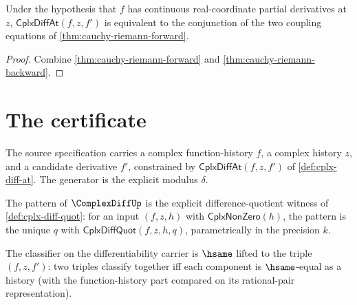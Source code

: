 \begin{lemma}
\label{lem:cauchy-riemann-iff}
Under the hypothesis that \(f\) has continuous real-coordinate partial derivatives at \(z\), \(\mathsf{CplxDiffAt}(f, z, f')\) is equivalent to the conjunction of the two coupling equations of \autoref{thm:cauchy-riemann-forward}.
\end{lemma}
\begin{proof}
Combine \autoref{thm:cauchy-riemann-forward} and \autoref{thm:cauchy-riemann-backward}.
\end{proof}

\section{The certificate}

\begin{definition}
\label{def:cplx-diff-source-specification}
The source specification carries a complex function-history \(f\), a complex history \(z\), and a candidate derivative \(f'\), constrained by \(\mathsf{CplxDiffAt}(f, z, f')\) of \autoref{def:cplx-diff-at}. The generator is the explicit modulus \(\delta\).
\end{definition}

\begin{definition}
\label{def:cplx-diff-pattern-specification}
The pattern of \(\ComplexDiffUp\) is the explicit difference-quotient witness of \autoref{def:cplx-diff-quot}: for an input \((f, z, h)\) with \(\mathsf{CplxNonZero}(h)\), the pattern is the unique \(q\) with \(\mathsf{CplxDiffQuot}(f, z, h, q)\), parametrically in the precision \(k\).
\end{definition}

\begin{definition}
\label{def:cplx-diff-classifier-specification}
The classifier on the differentiability carrier is \(\hsame\) lifted to the triple \((f, z, f')\): two triples classify together iff each component is \(\hsame\)-equal as a history (with the function-history part compared on its rational-pair representation).
\end{definition}

